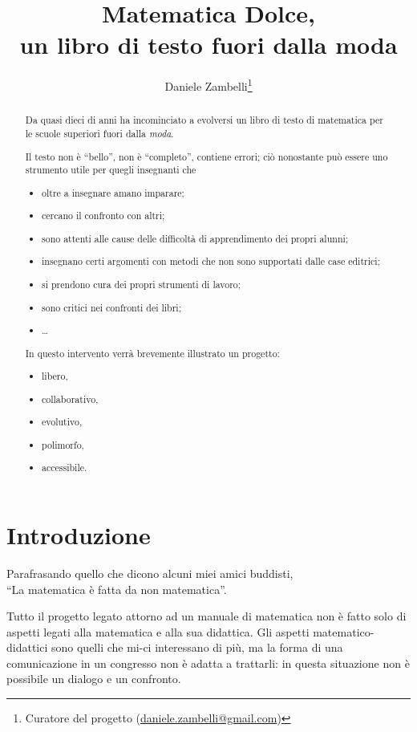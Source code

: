 \documentclass[a4paper,10pt]{article}
\title{Matematica Dolce,\\ 
un libro di testo fuori dalla moda}
\author{Daniele Zambelli\footnote{Curatore del progetto 
(\href{mailto:daniele.zambelli@gmail.com}{daniele.zambelli@gmail.com})}}
\begin{document}
\maketitle

\begin{abstract}
Da quasi dieci di anni ha incominciato a evolversi un libro di testo di 
matematica per le scuole superiori fuori dalla \emph{moda}.

Il testo non è ``bello'', non è ``completo'', contiene errori;
ciò nonostante può essere uno strumento utile per quegli insegnanti che
\begin{itemize} [noitemsep]
\item oltre a insegnare amano imparare;
\item cercano il confronto con altri;
\item sono attenti alle cause delle difficoltà di apprendimento dei propri 
alunni;
\item insegnano certi argomenti con metodi che non sono supportati dalle case 
editrici;
\item si prendono cura dei propri strumenti di lavoro;
\item sono critici nei confronti dei libri;
\item \dots
\end{itemize}

In questo intervento verrà brevemente illustrato un progetto:
\begin{itemize} [noitemsep]
\item libero,
\item collaborativo,
\item evolutivo,
\item polimorfo,
\item accessibile.
\end{itemize}

\end{abstract}

\section{Introduzione}
\begin{flushright}
Parafrasando quello che dicono alcuni miei amici buddisti, \\
``La matematica è fatta da non matematica''.
\end{flushright}

Tutto il progetto legato attorno ad un manuale di matematica non è fatto solo 
di aspetti legati alla matematica e alla sua didattica. 
Gli aspetti matematico-didattici sono quelli che mi-ci interessano di più, ma 
la forma di una comunicazione in un congresso non è adatta a trattarli:
in questa situazione non è possibile un dialogo e un confronto.
\end{document}
